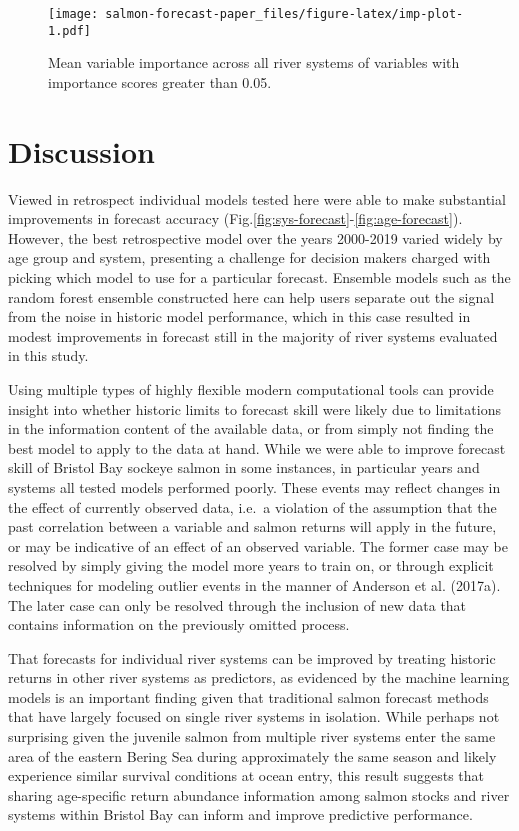 \documentclass[
]{article}
\begin{document}
\begin{figure}
\centering
\texttt{[image: salmon-forecast-paper\_files/figure-latex/imp-plot-1.pdf]}
\caption{\label{fig:imp-plot}Mean variable importance across all river systems of variables with importance scores greater than 0.05.}
\end{figure}

\hypertarget{discussion}{%
\section*{Discussion}\label{discussion}}

Viewed in retrospect individual models tested here were able to make substantial improvements in forecast accuracy (Fig.\ref{fig:sys-forecast}-\ref{fig:age-forecast}). However, the best retrospective model over the years 2000-2019 varied widely by age group and system, presenting a challenge for decision makers charged with picking which model to use for a particular forecast. Ensemble models such as the random forest ensemble constructed here can help users separate out the signal from the noise in historic model performance, which in this case resulted in modest improvements in forecast still in the majority of river systems evaluated in this study.

Using multiple types of highly flexible modern computational tools can provide insight into whether historic limits to forecast skill were likely due to limitations in the information content of the available data, or from simply not finding the best model to apply to the data at hand. While we were able to improve forecast skill of Bristol Bay sockeye salmon in some instances, in particular years and systems all tested models performed poorly. These events may reflect changes in the effect of currently observed data, i.e.~a violation of the assumption that the past correlation between a variable and salmon returns will apply in the future, or may be indicative of an effect of an observed variable. The former case may be resolved by simply giving the model more years to train on, or through explicit techniques for modeling outlier events in the manner of Anderson et al. (2017a). The later case can only be resolved through the inclusion of new data that contains information on the previously omitted process.

That forecasts for individual river systems can be improved by treating historic returns in other river systems as predictors, as evidenced by the machine learning models is an important finding given that traditional salmon forecast methods that have largely focused on single river systems in isolation. While perhaps not surprising given the juvenile salmon from multiple river systems enter the same area of the eastern Bering Sea during approximately the same season and likely experience similar survival conditions at ocean entry, this result suggests that sharing age-specific return abundance information among salmon stocks and river systems within Bristol Bay can inform and improve predictive performance.
\end{document}
